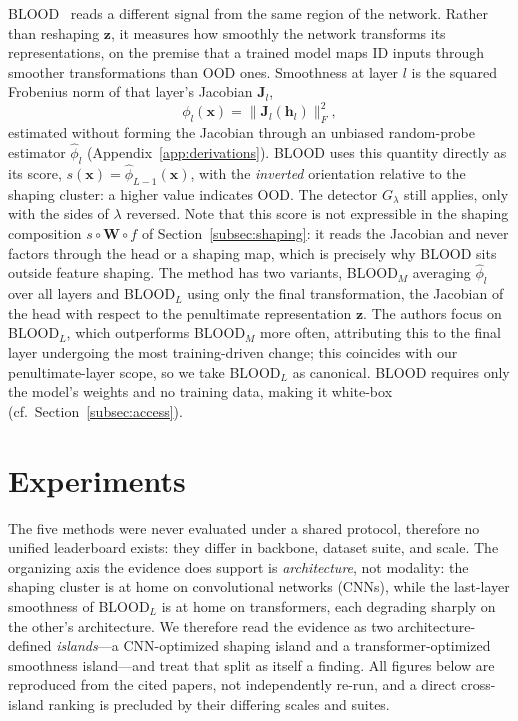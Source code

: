 \documentclass[a4paper]{article}
\begin{document}
BLOOD~\citep{blood} reads a different signal from the same region of the network.
Rather than reshaping $\mathbf{z}$, it measures how smoothly the network transforms
its representations, on the premise that a trained model maps ID inputs through
smoother transformations than OOD ones. Smoothness at layer $l$ is the squared
Frobenius norm of that layer's Jacobian $\mathbf{J}_l$,
\begin{equation}
\label{eq:blood}
\phi_l(\mathbf{x}) = \big\| \mathbf{J}_l(\mathbf{h}_l) \big\|_F^{2},
\end{equation}
estimated without forming the Jacobian through an unbiased random-probe estimator
$\hat{\phi}_l$ (Appendix~\ref{app:derivations}). BLOOD uses this
quantity directly as its score, $s(\mathbf{x}) = \hat{\phi}_{L-1}(\mathbf{x})$, with
the \emph{inverted} orientation relative to the shaping cluster: a higher value
indicates OOD. The detector $G_\lambda$ still applies, only with the sides of
$\lambda$ reversed. Note that this score is not expressible in the
shaping composition $s \circ \mathbf{W} \circ f$ of Section~\ref{subsec:shaping}: it
reads the Jacobian and never factors through the head or a shaping map, which is
precisely why BLOOD sits outside feature shaping. The method has two variants,
BLOOD$_M$ averaging $\hat{\phi}_l$ over all layers and BLOOD$_L$ using only the final
transformation, the Jacobian of the head with respect to the penultimate
representation $\mathbf{z}$. The authors focus on BLOOD$_L$, which outperforms
BLOOD$_M$ more often, attributing this to the final layer undergoing the most
training-driven change; this coincides with our penultimate-layer scope, so we take
BLOOD$_L$ as canonical. BLOOD requires only the model's weights and no training data,
making it white-box (cf.\ Section~\ref{subsec:access}).



\section{Experiments}
\label{sec:experiments}

The five methods were never evaluated under a shared protocol, therefore no unified
leaderboard exists: they differ in backbone, dataset suite, and scale. The organizing
axis the evidence does support is \emph{architecture}, not modality: the shaping
cluster is at home on convolutional networks (CNNs), while the last-layer smoothness of
BLOOD$_L$ is at home on transformers, each degrading sharply on the other's
architecture. We therefore read the evidence as two architecture-defined
\emph{islands}---a CNN-optimized shaping island and a transformer-optimized smoothness
island---and treat that split as itself a finding. All figures below are reproduced from
the cited papers, not independently re-run, and a direct cross-island ranking is
precluded by their differing scales and suites.
\end{document}
